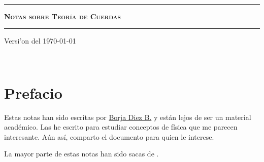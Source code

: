 \documentclass[letterpaper,11pt]{report}
\begin{document}
\sffamily

\thispagestyle{empty}
\begin{center}

\

\vspace{6.5cm}

\rule{15cm}{0.1cm}

\vspace{1.5cm}

{\huge \textsc{\textbf{Notas sobre Teoría de Cuerdas}}}

\vspace{1.5cm}

\rule{15cm}{0.1cm}

\vspace{1.5cm}

Versi'on del \today

\end{center}


\newpage
\thispagestyle{empty}
\ \\
\newpage
\setcounter{page}{1}

\pagestyle{plain}
\chapter*{Prefacio}
\bigskip
\bigskip
\bigskip
\bigskip
\bigskip
\bigskip
Estas notas han sido escritas por \href{https://github.com/10blackhole/}{ Borja Diez B.} y están lejos de ser un material académico. Las he escrito para estudiar conceptos de física que me parecen interesante. Aún así, comparto el documento para quien le interese. 

La mayor parte de estas notas han sido sacas de \cite{2009fcst.book.....Z}.



\bigskip
\bigskip
\bigskip
\bigskip
\bigskip
\bigskip





\bigskip
\bigskip
\bigskip

\bigskip
\bigskip
\bigskip


\tableofcontents
{}
\setcounter{page}{1}


\newpage
\printbibliography
\end{document}
